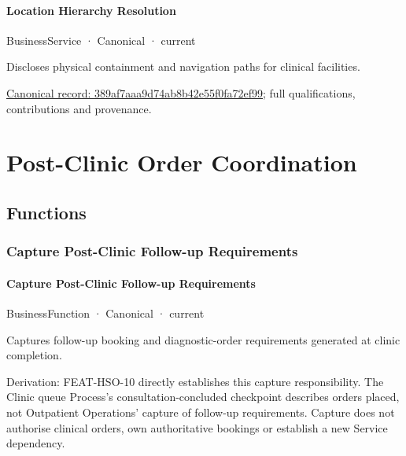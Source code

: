 \paragraph{Location Hierarchy Resolution}

\label{element:389af7aaa9d74ab8b42e55f0fa72ef99}
{\small BusinessService · Canonical · current}\par

Discloses physical containment and navigation paths for clinical facilities.


{\footnotesize \href{../../../../continuum/business/business-service/389af7aaa9d74ab8b42e55f0fa72ef99.md}{Canonical record: 389af7aaa9d74ab8b42e55f0fa72ef99}; full qualifications, contributions and provenance.}\par
\section{Post-Clinic Order Coordination}

\subsection{Functions}

\subsubsection{Capture Post-Clinic Follow-up Requirements}

\paragraph{Capture Post-Clinic Follow-up Requirements}

\label{element:9136f75069bf4770bcc8dc395204d475}
{\small BusinessFunction · Canonical · current}\par

Captures follow-up booking and diagnostic-order requirements generated at clinic completion.



Derivation: FEAT-HSO-10 directly establishes this capture responsibility. The Clinic queue Process's consultation-concluded checkpoint describes orders placed, not Outpatient Operations' capture of follow-up requirements. Capture does not authorise clinical orders, own authoritative bookings or establish a new Service dependency.


